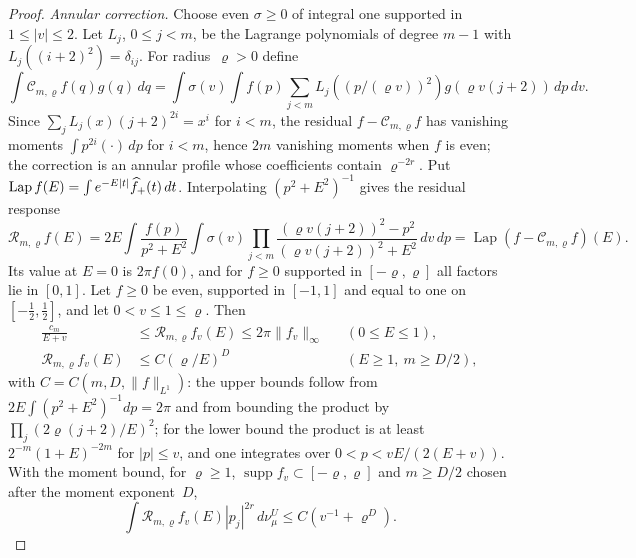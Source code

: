 \begin{proof}
\emph{Annular correction.} Choose even $\sigma\ge0$ of integral one supported in $1\le|v|\le2$. Let $L_j$, $0\le j<m$, be the Lagrange polynomials of degree $m-1$ with $L_j((i+2)^2)=\delta_{ij}$. For radius~$\varrho>0$ define
\begin{equation*}
\int\mathcal C_{m,\varrho}f(q)g(q)\,dq
=\int\sigma(v)\int f(p)\sum_{j<m}L_j((p/(\varrho v))^2)g(\varrho v(j+2))\,dp\,dv.
\end{equation*}
Since $\sum_jL_j(x)(j+2)^{2i}=x^i$ for $i<m$, the residual $f-\mathcal C_{m,\varrho}f$ has vanishing moments $\int p^{2i}(\cdot)\,dp$ for $i<m$, hence $2m$ vanishing moments when $f$ is even; the correction is an annular profile whose coefficients contain $\varrho^{-2r}$. Put $\operatorname{Lap}f(E)=\int e^{-E|t|}\widehat{f}_{+}(t)\,dt$. Interpolating $(p^2+E^2)^{-1}$ gives the residual response
\begin{equation}\label{eq:H-residual-response}
\mathcal R_{m,\varrho}f(E)=2E\int\frac{f(p)}{p^2+E^2}\int\sigma(v)
\prod_{j<m}\frac{(\varrho v(j+2))^2-p^2}{(\varrho v(j+2))^2+E^2}\,dv\,dp
=\operatorname{Lap}(f-\mathcal C_{m,\varrho}f)(E).
\end{equation}
Its value at $E=0$ is $2\pi f(0)$, and for $f\ge0$ supported in $[-\varrho,\varrho]$ all factors lie in $[0,1]$. Let $f\ge0$ be even, supported in $[-1,1]$ and equal to one on $[-\tfrac12,\tfrac12]$, and let $0<v\le1\le\varrho$. Then
\begin{align*}
\frac{c_m}{E+v}&\le\mathcal R_{m,\varrho}f_v(E)\le2\pi\|f_v\|_\infty
&& (0\le E\le1),\\
\mathcal R_{m,\varrho}f_v(E)&\le C(\varrho/E)^D
&& (E\ge1,\ m\ge D/2),
\end{align*}
with $C=C(m,D,\|f\|_{L^1})$: the upper bounds follow from $2E\int(p^2+E^2)^{-1}dp=2\pi$ and from bounding the product by $\prod_j(2\varrho(j+2)/E)^2$; for the lower bound the product is at least $2^{-m}(1+E)^{-2m}$ for $|p|\le v$, and one integrates over $0<p<vE/(2(E+v))$. With the moment bound, for $\varrho\ge1$, $\operatorname{supp}f_v\subset[-\varrho,\varrho]$ and $m\ge D/2$ chosen after the moment exponent~$D$,
\begin{equation}\label{eq:H-residual-cost}
\int\mathcal R_{m,\varrho}f_v(E)|p_j|^{2r}\,d\nu_\mu^U\le C(v^{-1}+\varrho^D).
\end{equation}


\end{proof}
